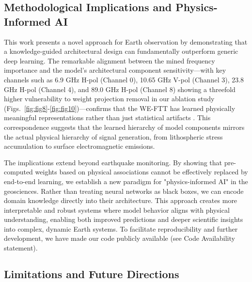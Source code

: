 \documentclass[preprint,review,12pt,authoryear]{elsarticle}
\begin{document}
\subsection{Methodological Implications and Physics-Informed AI}\label{sec:discuss_implications}

This work presents a novel approach for Earth observation by demonstrating that a knowledge-guided architectural design can fundamentally outperform generic deep learning. The remarkable alignment between the mined frequency importance and the model's architectural component sensitivity---with key channels such as 6.9 GHz H-pol (Channel 0), 10.65 GHz V-pol (Channel 3), 23.8 GHz H-pol (Channel 4), and 89.0 GHz H-pol (Channel 8) showing a threefold higher vulnerability to weight projection removal in our ablation study (Figs.~\ref{fig:fig8}-\ref{fig:fig10})---confirms that the WE-FTT has learned physically meaningful representations rather than just statistical artifacts \citep{maoAdditionalMicrowaveRadiation2020}. This correspondence suggests that the learned hierarchy of model components mirrors the actual physical hierarchy of signal generation, from lithospheric stress accumulation to surface electromagnetic emissions.

The implications extend beyond earthquake monitoring. By showing that pre-computed weights based on physical associations cannot be effectively replaced by end-to-end learning, we establish a new paradigm for "physics-informed AI" in the geosciences. Rather than treating neural networks as black boxes, we can encode domain knowledge directly into their architecture. This approach creates more interpretable and robust systems where model behavior aligns with physical understanding, enabling both improved predictions and deeper scientific insights into complex, dynamic Earth systems. To facilitate reproducibility and further development, we have made our code publicly available (see Code Availability statement).

\subsection{Limitations and Future Directions}\label{sec:discuss_limitations}
\end{document}

